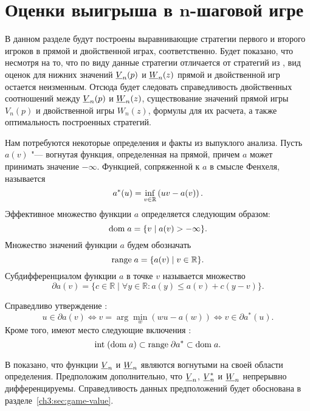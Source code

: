 {\section{Оценки выигрыша в $\mathbf{ n }$-шаговой игре}
\label{ch3:sec:value-bounds}

В данном разделе будут построены выравнивающие стратегии первого и второго игроков в прямой и двойственной играх, соответственно.
Будет показано, что несмотря на то, что по виду данные стратегии отличается от стратегий из \cite{demeyer02}, вид оценок для нижних значений $\LV{n}(p)$ и $\LW{n}(z)$ прямой и двойственной игр остается неизменным.
Отсюда будет следовать справедливость двойственных соотношений между $\LV{n}(p)$ и $\LW{n}(z)$, существование значений прямой игры $V_n(p)$ и двойственной игры $W_n(z)$, формулы для их расчета, а также оптимальность построенных стратегий.

Нам потребуются некоторые определения и факты из выпуклого анализа.
%
Пусть $a(v)$ "--- вогнутая функция, определенная на прямой, причем $a$ может принимать значение $-\infty$.
Функцией, сопряженной к $a$ в смысле Фенхеля, называется
\begin{equation*}
  a^*(u) = \inf_{v \in \mathbb{R}} \left( u v - a(v) \right).
\end{equation*}
Эффективное множество функции $a$ определяется следующим образом:
\[
\mathrm{dom\;} a = \{ v \;|\; a(v) > -\infty \}.
\]
Множество значений функции $a$ будем обозначать \[
\mathrm{range\;} a = \{ a(v) \;|\; v \in \mathbb{R} \}.
\]
%
Субдифференциалом функции $a$ в точке $v$ называется множество
\begin{equation*}
  \partial a(v) =
  \{ c \in \mathbb{R} \;|\; \forall y \in \mathbb{R}: a(y) \leqslant a(v) + c(y-v) \}.
\end{equation*}

Справедливо утверждение \cite[Теорема 23.5]{rockafellar73}:
\begin{equation}\label{ch3:eq:subdiff-props}
  u \in \partial a(v)
  \iff v = \arg\!\min_w \left( w u - a(w) \right)
  \iff v \in \partial a^*(u) .
\end{equation}
Кроме того, имеют место следующие включения \cite[\S~24]{rockafellar73}:
\begin{equation}\label{ch3:eq:dual-range}
  \mathrm{int} \; (\mathrm{dom\;} a) \subset \mathrm{range\;} \partial a^* \subset \mathrm{dom\;} a.
\end{equation}

В \cite{demeyer02} показано, что функции $\LV{n}$ и $\LW{n}$ являются вогнутыми на своей области определения.
Предположим дополнительно, что $\LV{n}$, $\LV[*]{n}$ и $\LW{n}$ непрерывно дифференцируемы.
Справедливость данных предположений будет обоснована в разделе~\ref{ch3:sec:game-value}.


}
